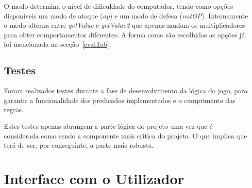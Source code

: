 \documentclass[a4paper]{article}
\begin{document}
O modo determina o nível de dificuldade do computador, tendo como opções disponíveis um modo de ataque (\textit{op}) e um modo de defesa (\textit{notOP}). Internamente o modo alterna entre \textit{getValue} e \textit{getValue2} que apenas mudam os multiplicadores para obter comportamentos diferentes. A forma como são escolhidas as opções já foi mencionada na secção~\ref{evalTab}.

\subsection{Testes}

Foram realizados testes durante a fase de desenvolvimento da lógica do jogo, para garantir a funcionalidade dos predicados implementados e o cumprimento das regras.

Estes testes apenas abrangem a parte lógica do projeto uma vez que é considerada como sendo a componente mais critica do projeto. O que implica que terá de ser, por conseguinte, a parte mais robusta.


\newpage
\section{Interface com o Utilizador}
\end{document}
